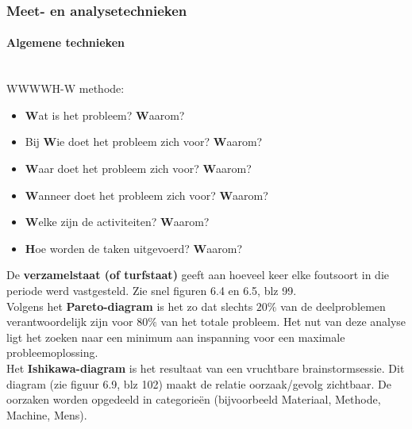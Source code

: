 \documentclass[12pt]{article}
\begin{document}
\subsubsection{Meet- en analysetechnieken}
\paragraph{Algemene technieken}\mbox{}\\
WWWWH-W methode:
\begin{itemize}
\item \textbf{W}at is het probleem? \textbf{W}aarom?
\item Bij \textbf{W}ie doet het probleem zich voor? \textbf{W}aarom?
\item \textbf{W}aar doet het probleem zich voor? \textbf{W}aarom?
\item \textbf{W}anneer doet het probleem zich voor? \textbf{W}aarom?
\item \textbf{W}elke zijn de activiteiten? \textbf{W}aarom?
\item \textbf{H}oe worden de taken uitgevoerd? \textbf{W}aarom?
\end{itemize}
De \textbf{verzamelstaat (of turfstaat)} geeft aan hoeveel keer elke foutsoort in die periode werd vastgesteld. Zie snel figuren 6.4 en 6.5, blz 99.\\
Volgens het \textbf{Pareto-diagram} is het zo dat slechts $20\%$ van de deelproblemen verantwoordelijk zijn voor $80\%$ van het totale probleem. Het nut van deze analyse ligt het zoeken naar een minimum aan inspanning voor een maximale probleemoplossing.\\
Het \textbf{Ishikawa-diagram} is het resultaat van een vruchtbare brainstormsessie. Dit diagram (zie figuur 6.9, blz 102) maakt de relatie oorzaak/gevolg zichtbaar. De oorzaken worden opgedeeld in categorie\"en (bijvoorbeeld Materiaal, Methode, Machine, Mens).
\end{document}
